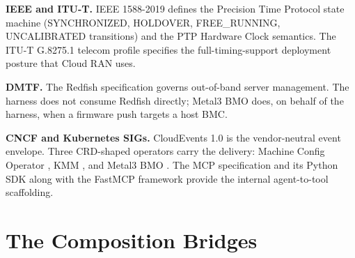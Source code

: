 \documentclass[twocolumn,10pt,a4paper]{article}
\begin{document}
\textbf{IEEE and ITU-T.} IEEE 1588-2019 \cite{ieee_1588_2019} defines the Precision Time Protocol state machine (SYNCHRONIZED, HOLDOVER, FREE\_RUNNING, UNCALIBRATED transitions) and the PTP Hardware Clock semantics. The ITU-T G.8275.1 telecom profile \cite{itu_g82751} specifies the full-timing-support deployment posture that Cloud RAN uses.

\textbf{DMTF.} The Redfish specification \cite{dmtf_redfish} governs out-of-band server management. The harness does not consume Redfish directly; Metal3 BMO does, on behalf of the harness, when a firmware push targets a host BMC.

\textbf{CNCF and Kubernetes SIGs.} CloudEvents 1.0 \cite{cncf_cloudevents} is the vendor-neutral event envelope. Three CRD-shaped operators carry the delivery: Machine Config Operator \cite{openshift_mco}, KMM \cite{kmm_operator}, and Metal3 BMO \cite{metal3_bmo}. The MCP specification \cite{mcp_spec} and its Python SDK \cite{mcp_python_sdk} along with the FastMCP framework \cite{fastmcp} provide the internal agent-to-tool scaffolding.

\section{The Composition Bridges}
\label{sec:bridges}
\end{document}
